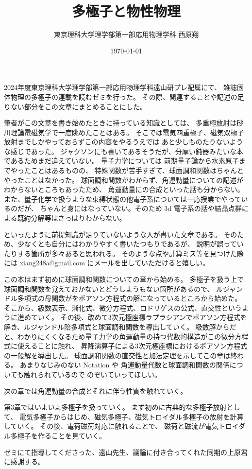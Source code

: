 \documentclass[11pt,dvipdfmx,a4paper]{jsreport}
\title{多極子と物性物理}
\author{東京理科大学理学部第一部応用物理学科 西原翔}
\date{\today}
\begin{document}

\maketitle

2024年度東京理科大学理学部第一部応用物理学科遠山研プレ配属にて、
雑誌固体物理の多極子の連載を読むゼミを行った。
その際、関連することや記述の足りない部分をこの文章にまとめることにした。

筆者がこの文章を書き始めたときに持っている知識としては、
多重極放射は砂川理論電磁気学\cite{Sunakawa}で一度眺めたことはある。
そこでは電気四重極子、磁気双極子放射までしかやっておらずこの内容をやるうえでは
あと少しものたりないような感じであった。
ジャクソン\cite{Jackson}にも書いてあるそうだが、分厚い鈍器みたいな本であるためまだ追えていない。
量子力学については
前期量子論から水素原子までやったことはあるものの、
特殊関数が苦手すぎて、球面調和関数はちゃんとやったことはなかった。
球面調和関数がわからず、角運動量についての記述がわからないところもあったため、
角運動量にの合成といった話も分からない。
また、量子化学で扱うような束縛状態の他電子系については一応授業でやっているのだが、
ちゃんと身にはなっていない。そのため 3d 電子系の話や結晶点群による既約分解等はさっぱりわからない。

といったように前提知識が足りていないような人が書いた文章である。
そのため、少なくとも自分にはわかりやすく書いたつもりであるが、
説明が誤っていたりする箇所が多々あると思われる。
そのような点や計算ミス等を見つけた際には
xiang248a@gmail.com にメールを出していただけると嬉しい。

この本はまず初めに球面調和関数についての章から始める。
多極子を扱う上で球面調和関数を覚えておかないとどうしようもない箇所があるので、
ルジャンドル多項式の母関数がをポアソン方程式の解になっているところから始めた。
そこから、級数表示、漸化式、微分方程式、ロドリゲスの公式、直交性というように進めていく。
その後、改めて3次元極座標ラプラシアンでポアソン方程式を解き、ルジャンドル陪多項式と球面調和関数を導出していく。
級数解からだと、わかりにくくなるため量子力学の角運動量の持つ代数的構造がこの微分方程式に使えることに触れ、
昇降演算子による3次元極座標におけるポアソン方程式の一般解を導出した。
球面調和関数の直交性と加法定理を示してこの章は終わる。
あまりなじみのない Notation や 角運動量代数と球面調和関数の関係についても触れられているので
のぞいていってほしい。

次の章では角運動量の合成とそれに伴う性質を触れていく。

第3章ではいよいよ多極子を扱っていく。
まず初めに古典的な多極子放射として、
電気多極子からはじめ、磁気多極子、磁気トロイダル多極子の放射を計算していく。
その後、電荷磁荷対応に触れることで、
磁荷と磁流が電気トロイダル多極子を作ることを見ていく。

ゼミにて指導してくださった、遠山先生、議論に付き合ってくれた同期の上原君に感謝する。

\clearpage

\tableofcontents

\clearpage

\clearpage

\clearpage





\end{document}
